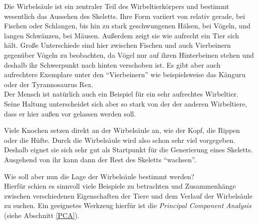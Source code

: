 Die Wirbelsäule ist ein zentraler Teil des Wirbeltierkörpers und bestimmt wesentlich das Aussehen des Skeletts.
Ihre Form variiert von relativ gerade, \zb bei Fischen oder Schlangen, bis hin zu stark geschwungenen Hälsen, \va bei Vögeln, und langen Schwänzen, \zb bei Mäusen. Außerdem zeigt sie wie aufrecht ein Tier sich hält. Große Unterschiede sind hier zwischen Fischen und auch Vierbeinern gegenüber Vögeln zu beobachten, da Vögel nur auf ihren Hinterbeinen stehen und deshalb ihr Schwerpunkt nach hinten verschoben ist. Es gibt aber auch aufrechtere Exemplare unter den "`Vierbeinern"' wie beispielsweise das Känguru oder der Tyrannosaurus Rex. \\
Der Mensch ist natürlich auch ein Beispiel für ein sehr aufrechtes Wirbeltier. Seine Haltung unterscheidet sich aber so stark von der der anderen Wirbeltiere, dass er hier außen vor gelassen werden soll.

Viele Knochen setzen direkt an der Wirbelsäule an, wie \zb der Kopf, die Rippen oder die Hüfte. Durch die Wirbelsäule wird also schon sehr viel vorgegeben.
Deshalb eignet sie sich sehr gut als Startpunkt für die Generierung eines Skeletts. Ausgehend von ihr kann dann der Rest des Skeletts "`wachsen"'.

Wie soll aber nun die Lage der Wirbelsäule bestimmt werden?\\
Hierfür schien es sinnvoll viele Beispiele zu betrachten und Zusammenhänge zwischen verschiedenen Eigenschaften der Tiere und dem Verlauf der Wirbelsäule zu suchen.
Ein geeignetes Werkzeug hierfür ist die \emph{Principal Component Analysis} (siehe Abschnitt \ref{PCA}).

